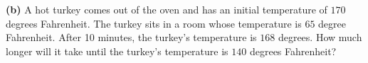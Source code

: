 \documentclass[12pt,letterpaper,twoside]{amsart}
\newcounter{problem}
\newcommand{\problem}{\bigskip \noindent {\large {\sc Problem \arabic{problem}:}} \addtocounter{problem}{1}}
\begin{document}
{\bf (b)} A hot turkey comes out of the oven and has an initial temperature of $170$ degrees Fahrenheit.  The turkey sits in a room whose temperature is $65$ degree Fahrenheit.  After 10 minutes, the turkey's temperature is $168$ degrees.  How much longer will it take until the turkey's temperature is $140$ degrees Fahrenheit?

\end{document}
